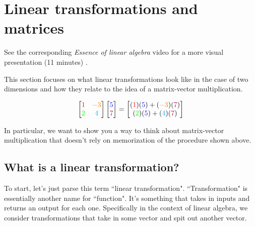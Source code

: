 \section{Linear transformations and matrices}

\begin{remark}
  See the corresponding \textit{Essence of linear algebra} video for a more
  visual presentation (11 minutes)
  \cite{bib:linalg_linear_transformations_and_matrices}.
\end{remark}

This section focuses on what linear transformations look like in the case of two
dimensions and how they relate to the idea of a matrix-vector multiplication.

\begin{equation*}
  \begin{bmatrix}
    \textcolor{red}{1} & \textcolor{orange}{-3} \\
    \textcolor{green}{2} & \textcolor{cyan}{4}
  \end{bmatrix}
  \begin{bmatrix}
    \textcolor{blue}{5} \\
    \textcolor{purple}{7}
  \end{bmatrix} = \begin{bmatrix}
    (\textcolor{red}{1})(\textcolor{blue}{5}) +
      (\textcolor{orange}{-3})(\textcolor{purple}{7}) \\
    (\textcolor{green}{2})(\textcolor{blue}{5}) +
      (\textcolor{cyan}{4})(\textcolor{purple}{7})
  \end{bmatrix}
\end{equation*}

In particular, we want to show you a way to think about matrix-vector
multiplication that doesn't rely on memorization of the procedure shown above.

\subsection{What is a linear transformation?}

To start, let's just parse this term ``linear transformation". ``Transformation"
is essentially another name for ``function". It's something that takes in inputs
and returns an output for each one. Specifically in the context of linear
algebra, we consider transformations that take in some vector and spit out
another vector.

